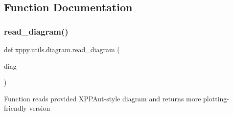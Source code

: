 \subsection{Function Documentation}
\mbox{\label{namespacexppy_1_1utils_1_1diagram_a0ce186ce6f21dbf7012b06027fba023b}} 
\subsubsection{\texorpdfstring{read\+\_\+diagram()}{read\_diagram()}}
{\footnotesize\ttfamily def xppy.\+utils.\+diagram.\+read\+\_\+diagram (\begin{DoxyParamCaption}\item[{}]{diag }\end{DoxyParamCaption})}

\begin{DoxyVerb}Function reads provided XPPAut-style diagram and returns more
plotting-friendly version
\end{DoxyVerb}
 